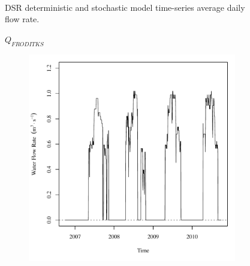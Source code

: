 \begin{linenumbers}
\begin{landscape}
\begin{figure}
\begin{subfigure}{0.7\textwidth}
		\end{subfigure}\\
		\caption{DSR deterministic and stochastic model time-series average daily flow rate.}
	\end{figure}
\end{landscape}
\subfiguremid
\begin{landscape}
	\begin{figure}
		\centering
		$ Q_{FRODITKS} $
		\begin{subfigure}{0.7\textwidth}
			\centering
			\includegraphics[width=\tableCustomSize]{"Figures/Results_DSR/Deterministic/Q FRO"}
		\end{subfigure}%
		\begin{subfigure}{0.7\textwidth}
			\centering

\end{subfigure}
\end{figure}
\end{landscape}
\end{linenumbers}

